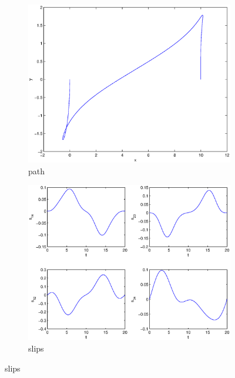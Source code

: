 \begin{figure}
\begin{subfigure}[b]{\textwidth}
\centering
\includegraphics[height=0.3\textheight]{img/final_1_1_20_path.eps}
\caption{path}
\end{subfigure}

\begin{subfigure}[b]{\textwidth}
\centering
\includegraphics[height=0.3\textheight]{img/final_1_1_20_slips.eps}
\caption{slips}
\end{subfigure}


\end{figure}
